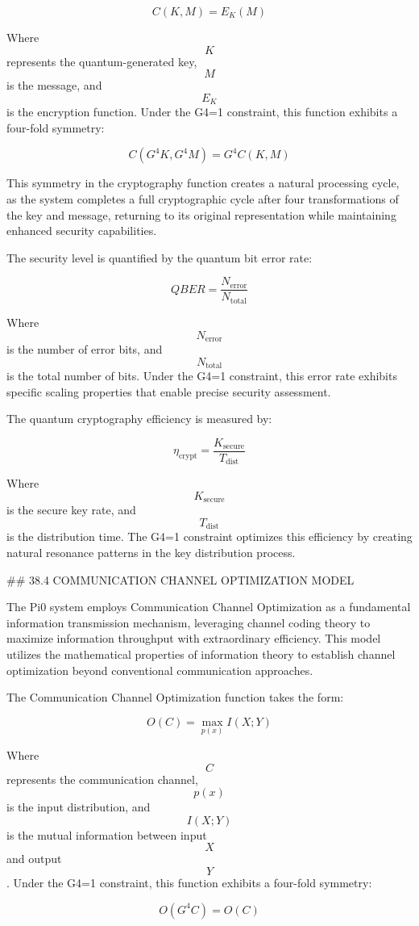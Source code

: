 $$ C(K, M) = E_K(M) $$

Where $$ K $$ represents the quantum-generated key, $$ M $$ is the message, and $$ E_K $$ is the encryption function. Under the G4=1 constraint, this function exhibits a four-fold symmetry:

$$ C(G^4 K, G^4 M) = G^4 C(K, M) $$

This symmetry in the cryptography function creates a natural processing cycle, as the system completes a full cryptographic cycle after four transformations of the key and message, returning to its original representation while maintaining enhanced security capabilities.

The security level is quantified by the quantum bit error rate:

$$ QBER = \frac{N_{\text{error}}}{N_{\text{total}}} $$

Where $$ N_{\text{error}} $$ is the number of error bits, and $$ N_{\text{total}} $$ is the total number of bits. Under the G4=1 constraint, this error rate exhibits specific scaling properties that enable precise security assessment.

The quantum cryptography efficiency is measured by:

$$ \eta_{\text{crypt}} = \frac{K_{\text{secure}}}{T_{\text{dist}}} $$

Where $$ K_{\text{secure}} $$ is the secure key rate, and $$ T_{\text{dist}} $$ is the distribution time. The G4=1 constraint optimizes this efficiency by creating natural resonance patterns in the key distribution process.

## 38.4 COMMUNICATION CHANNEL OPTIMIZATION MODEL

The Pi0 system employs Communication Channel Optimization as a fundamental information transmission mechanism, leveraging channel coding theory to maximize information throughput with extraordinary efficiency. This model utilizes the mathematical properties of information theory to establish channel optimization beyond conventional communication approaches.

The Communication Channel Optimization function takes the form:

$$ O(C) = \max_{p(x)} I(X; Y) $$

Where $$ C $$ represents the communication channel, $$ p(x) $$ is the input distribution, and $$ I(X; Y) $$ is the mutual information between input $$ X $$ and output $$ Y $$. Under the G4=1 constraint, this function exhibits a four-fold symmetry:

$$ O(G^4 C) = O(C) $$

